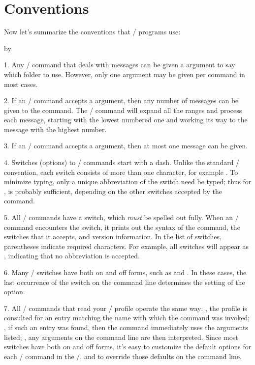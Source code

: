 \section{Conventions}
Now let's summarize the conventions that \MH/ programs use:
\smallskip
{\advance\leftskip by\parindent
\item{1.} Any \MH/ command that deals with messages can be given a
 argument to say which folder to use.
However, only one  argument may be given per command
in most cases.

\item{2.} If an \MH/ command accepts a  argument,
then any number of messages can be given to the command.
The \MH/ command will expand all the ranges and process each message,
starting with the lowest numbered one and working its way to the message with
the highest number.

\item{3.} If an \MH/ command accepts a  argument,
then at most one message can be given.

\item{4.} Switches (options) to \MH/ commands start with a dash.
Unlike the standard \unix/ convention,
each switch consists of more than one character,
for example .
To minimize typing,
only a unique abbreviation of the switch need be typed;
thus for ,  is probably sufficient,
depending on the other switches accepted by the command.

\item{5.} All \MH/ commands have a  switch,
which {\it must} be spelled out fully.
When an \MH/ command encounters the  switch,
it prints out the syntax of the command,
the switches that it accepts,
and version information.
In the list of switches,
parentheses indicate required characters.
For example,
all  switches will appear as ,
indicating that no abbreviation is accepted.

\item{6.} Many \MH/ switches have both on and off forms,
such as  and .
In these cases,
the last occurrence of the switch on the command line determines the setting
of the option.

\item{7.} All \MH/ commands that read your \MH/ profile operate the
same way:
,
the profile is consulted for an entry matching the name with which
the command was invoked;
,
if such an entry was found,
then the command immediately uses the arguments listed;
,
any arguments on the command line are then interpreted.
Since most switches have both on and off forms,
it's easy to customize the default options for each \MH/ command in the
\profile/,
and to override those defaults on the command line.
\smallskip}

